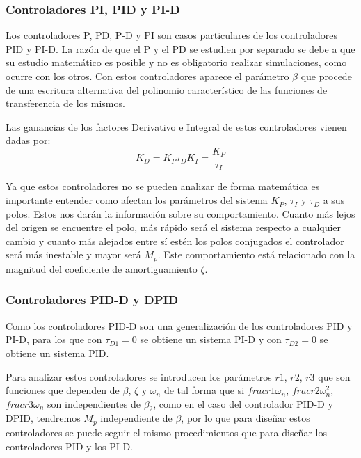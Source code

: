 \documentclass[a4paper]{article}
\begin{document}
\subsubsection{Controladores PI, PID y PI-D}
Los controladores P, PD, P-D y PI son casos particulares de los controladores PID y PI-D. La razón de que el P y el PD se estudien por separado se debe a que su estudio matemático es posible y no es obligatorio realizar simulaciones, como ocurre con los otros.
Con estos controladores aparece el parámetro $\beta$ que procede de una escritura alternativa del polinomio característico de las funciones de transferencia de los mismos.

Las ganancias de los factores Derivativo e Integral de estos controladores vienen dadas por:
\begin{subequations}
	\begin{equation}
	K_D=K_P \tau_D
	\end{equation}
	\begin{equation}
	K_I=\frac{K_P}{\tau_I}
	\end{equation}
\end{subequations}

Ya que estos controladores no se pueden analizar de forma matemática es importante entender como afectan los parámetros del sistema $K_P$, $\tau_I$ y $\tau_D$ a sus polos. Estos nos darán la información sobre su comportamiento. Cuanto más lejos del origen se encuentre el polo, más rápido será el sistema respecto a cualquier cambio y cuanto más alejados entre sí estén los polos conjugados el controlador será más inestable y mayor será $M_p$. Este comportamiento está relacionado con la magnitud del coeficiente de amortiguamiento $\zeta$.

\subsubsection{Controladores PID-D y D\textbar PID}
Como los controladores PID-D son una generalización de los controladores PID y PI-D, para los que con $\tau_{D1}=0$ se obtiene un sistema PI-D y con $\tau_{D2}=0$ se obtiene un sistema PID.

Para analizar estos controladores se introducen los parámetros $r1$, $r2$, $r3$ que son funciones que dependen de $\beta$, $\zeta$ y $\omega_n$ de tal forma que si $frac{r1}{\omega_n}$, $frac{r2}{\omega_n^2}$, $frac{r3}{\omega_n}$ son independientes de $\beta_2$, como en el caso del controlador PID-D y D\textbar PID, tendremos $M_p$ independiente de $\beta$, por lo que para diseñar estos controladores se puede seguir el mismo procedimientos que para diseñar los controladores PID y los PI-D.
\end{document}
